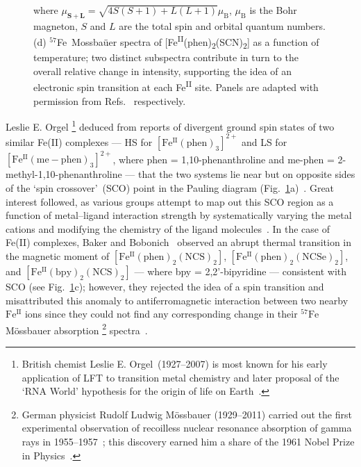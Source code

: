 \begin{figure}[t!]
{    where $\mu_{\boldsymbol{S} + \boldsymbol{L}} = \sqrt{4 S(S + 1) + L(L + 1)} \mu_\text{B}$,
    $\mu_\text{B}$ is the Bohr magneton, $S$ and $L$ are the total spin and orbital quantum numbers.
    (d) $^{57}$Fe~Mossba\"{u}er spectra of [Fe\textsuperscript{II}(phen)\textsubscript{2}(SCN)\textsubscript{2}]
    as a function of temperature;
    two distinct subspectra contribute in turn to the overall relative change in intensity,
    supporting the idea of an electronic spin transition at each Fe\textsuperscript{II} site.
    Panels are adapted with permission from Refs.~\cite{Pauling1932a, Cambi1933, Baker1964, Dezsi1967}
    respectively.
  }
  \label{fig: SCO-overview}
\end{figure}

Leslie E. Orgel%
\footnote{British chemist Leslie E. Orgel~(1927--2007) is most known
for his early application of LFT to transition metal chemistry
and later proposal of the `RNA World' hypothesis for
the origin of life on Earth~\cite{Orgel1994, Joyce2007}.}
deduced from reports of divergent ground spin states of two similar Fe(II) complexes ---
HS for $\mathrm{[Fe^{II}(phen)_3]^{2+}}$ and LS for $\mathrm{[Fe^{II}(me-phen)_3]^{2+}}$,
where phen = 1,10-phenanthroline and me-phen = 2-methyl-1,10-phenanthroline ---
that the two systems lie near but on opposite sides of
the `spin crossover'~(SCO) point in the Pauling diagram
(Fig.~\ref{fig: SCO-overview}a)~\cite{Irving1953, Orgel1956}.
%
Great interest followed, as various groups attempt to map out
this SCO region as a function of metal--ligand interaction strength
by systematically varying the metal cations
and modifying the chemistry of
the ligand molecules~\cite{Figgins1960, Stoufer1961, Madeja1963, White1964, Ewald1964}.
%
In the case of Fe(II) complexes, Baker and Bobonich~\cite{Baker1964}
observed an abrupt thermal transition in the magnetic moment of
$\mathrm{[Fe^{II}(phen)_2(NCS)_2]}$, $\mathrm{[Fe^{II}(phen)_2(NCSe)_2]}$,
and $\mathrm{[Fe^{II}(bpy)_2(NCS)_2]}$
--- where bpy = 2,2'-bipyridine --- consistent with SCO (see Fig.~\ref{fig: SCO-overview}c);
however, they rejected the idea of a spin transition
and misattributed this anomaly to antiferromagnetic interaction
between two nearby $\mathrm{Fe^{II}}$ ions since they could not find any corresponding change in
their $\mathrm{^{57}Fe}$ M\"{o}ssbauer absorption%
\footnote{German physicist Rudolf Ludwig M\"{o}ssbauer (1929--2011) carried out
the first experimental observation of recoilless nuclear resonance absorption
of gamma rays in 1955--1957~\cite{Mossbauer1958};
this discovery earned him a share of the 1961 Nobel Prize in Physics~\cite{Nobel1942}.}  spectra~\cite{Collins1966}.
